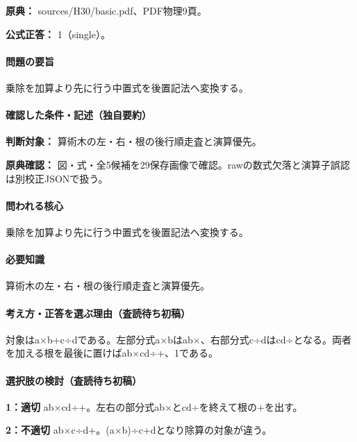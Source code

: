 \noindent\textbf{原典：} sources/H30/basic.pdf、PDF物理9頁。

\textbf{公式正答：} 1（single）。

\paragraph{問題の要旨} 乗除を加算より先に行う中置式を後置記法へ変換する。

\paragraph{確認した条件・記述（独自要約）}\mbox{}\par

\noindent\textbf{判断対象：} 算術木の左・右・根の後行順走査と演算優先。\par

\noindent\textbf{原典確認：} 図・式・全5候補を29保存画像で確認。rawの数式欠落と演算子誤認は別校正JSONで扱う。\par

\paragraph{問われる核心} 乗除を加算より先に行う中置式を後置記法へ変換する。

\paragraph{必要知識} 算術木の左・右・根の後行順走査と演算優先。

\paragraph{考え方・正答を選ぶ理由（査読待ち初稿）} 対象はa×b+c÷dである。左部分式a×bはab×、右部分式c÷dはcd÷となる。両者を加える根を最後に置けばab×cd÷+、1である。

\paragraph{選択肢の検討（査読待ち初稿）}\mbox{}\par

\noindent\textbf{1：適切} ab×cd÷+。左右の部分式ab×とcd÷を終えて根の+を出す。\par

\noindent\textbf{2：不適切} ab×c÷d+。(a×b)÷c+dとなり除算の対象が違う。\par

